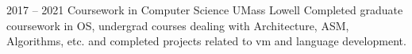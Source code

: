 \documentclass[9pt]{developercv} %
\begin{document}

\begin{entrylist}
	\entry
		{2017 -- 2021}
		{Coursework in Computer Science}
		{UMass Lowell}
		{
		Completed graduate coursework in OS, undergrad courses dealing with Architecture, ASM, Algorithms, etc.
		and completed projects related to vm and language development.
		}
\end{entrylist}

\vspace{8mm}

% 
\end{document}
